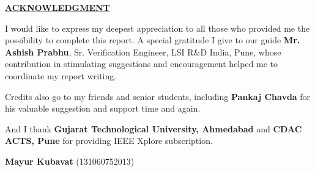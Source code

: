 \thispagestyle{plain}

\begin{center}
	\midsize\textbf{\underline {ACKNOWLEDGMENT}}
\end{center}
	
I would like to express my deepest appreciation to all those who provided me the possibility to complete this report. A special gratitude I give to our guide \textbf{Mr. Ashish Prabhu}, Sr. Verification Engineer, LSI R\&D India, Pune, whose contribution in stimulating suggestions and encouragement helped me to coordinate my report writing.

Credits also go to my friends and senior students, including \textbf{Pankaj Chavda} for his valuable suggestion and support time and again.

And I thank \textbf{Gujarat Technological University, Ahmedabad} and \textbf{CDAC ACTS, Pune} for providing IEEE Xplore subscription.

\vspace{4cm}

	\hfill \hfill \textbf{Mayur Kubavat} (131060752013)
